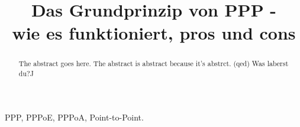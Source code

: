 \documentclass[journal]{IEEEtran}
\begin{document}
 
\title{Das Grundprinzip von PPP - \\wie es funktioniert, pros und cons} 
\author{
 }
\maketitle 
\begin{abstract} 
The abstract goes here. The abstract is abstract because it's abstrct. (qed) Was laberst du?^^
\end{abstract} 
\begin{IEEEkeywords} 
PPP, PPPoE, PPPoA, Point-to-Point. 
\end{IEEEkeywords}
\end{document}
